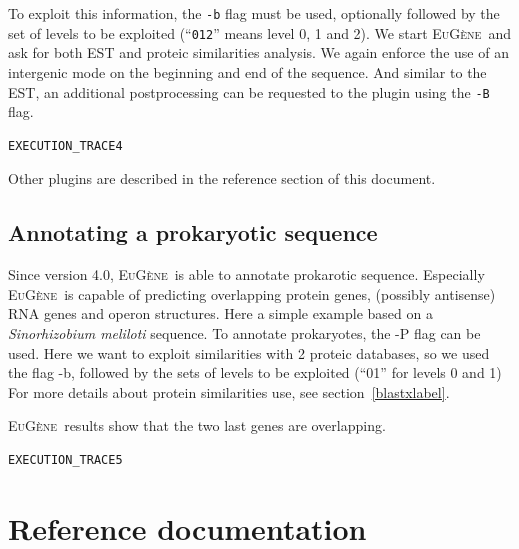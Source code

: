 \documentclass[a4paper,titlepage]{report}
\newcommand{\EuGene}{\textsc{EuG\`ene}}
\begin{document}
To exploit this information, the \texttt{-b} flag must be used,
optionally followed by the set of levels to be exploited
(``\texttt{012}'' means level 0, 1 and 2).  We start \EuGene\ and ask
for both EST and proteic similarities analysis. We again enforce the
use of an intergenic mode on the beginning and end of the sequence.
And similar to the EST, an additional postprocessing can be requested
to the plugin using the \texttt{-B} flag.

\begin{Verbatim}[fontsize=\scriptsize]
EXECUTION_TRACE4
\end{Verbatim}

Other plugins are described in the reference section of this document.

\section{Annotating a prokaryotic sequence}

Since version 4.0, \EuGene\ is able to annotate prokarotic sequence. Especially \EuGene\ is capable of predicting overlapping protein genes, (possibly antisense) RNA genes and operon structures.
Here a simple example based on a \textit{Sinorhizobium meliloti} sequence.
To annotate prokaryotes, the -P flag can be used. Here we want to exploit similarities with 2 proteic databases, 
so we used the flag -b, followed by the sets of levels to be exploited (``01'' for levels 0 and 1) For more details about protein similarities use, 
see section~\ref{blastxlabel}.

\EuGene\ results show that the two last genes are overlapping.


\begin{Verbatim}[fontsize=\scriptsize]
EXECUTION_TRACE5
\end{Verbatim}



\newpage
\chapter{Reference documentation}
\end{document}
